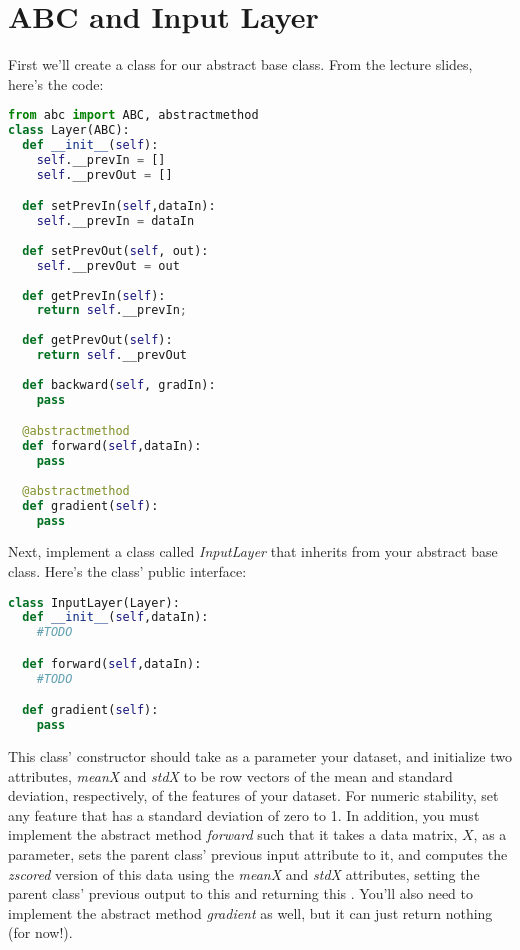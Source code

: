 \documentclass[12pt]{article}
\begin{document}
\newpage
\section{ABC and Input Layer}
First we'll create a class for our abstract base class.  From the lecture slides, here's the code:

\begin{lstlisting}[language=Python]
from abc import ABC, abstractmethod
class Layer(ABC):
  def __init__(self):
    self.__prevIn = []
    self.__prevOut = []

  def setPrevIn(self,dataIn):
    self.__prevIn = dataIn
  
  def setPrevOut(self, out):
    self.__prevOut = out
  
  def getPrevIn(self):
    return self.__prevIn;
  
  def getPrevOut(self):
    return self.__prevOut
  
  def backward(self, gradIn):
    pass

  @abstractmethod
  def forward(self,dataIn):
    pass
  
  @abstractmethod  
  def gradient(self):
    pass
\end{lstlisting}

\noindent
Next, implement a class called \emph{InputLayer} that inherits from your abstract base class.  Here's the class' public interface:
\begin{lstlisting}[language=Python]
class InputLayer(Layer):
  def __init__(self,dataIn):
    #TODO

  def forward(self,dataIn):
    #TODO

  def gradient(self):
    pass
\end{lstlisting}

\noindent
This class' constructor should take as a parameter your dataset, and initialize two attributes, \emph{meanX} and \emph{stdX} to be row vectors of the mean and standard deviation, respectively, of the features of your dataset. For numeric stability, set any feature that has a standard deviation of zero to 1.  In addition, you must implement the abstract method \emph{forward} such that it takes a data matrix, $X$, as a parameter, sets the parent class' previous input attribute to it, and computes the \emph{zscored} version of this data using the \emph{meanX} and \emph{stdX} attributes, setting the parent class' previous output to this and returning this .  You'll also need to implement the abstract method \emph{gradient} as well, but it can just return nothing (for now!).
\end{document}
